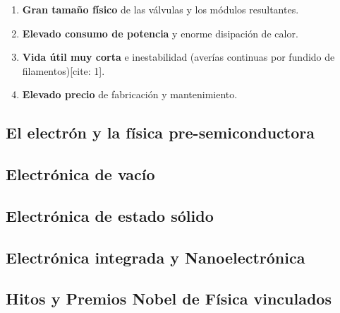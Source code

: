 \begin{enumerate}
    \item \textbf{Gran tamaño físico} de las válvulas y los módulos resultantes.
    \item \textbf{Elevado consumo de potencia} y enorme disipación de calor.
    \item \textbf{Vida útil muy corta} e inestabilidad (averías continuas por fundido de filamentos)[cite: 1].
    \item \textbf{Elevado precio} de fabricación y mantenimiento.
\end{enumerate}

\subsection{El electrón y la física pre-semiconductora}

\subsection{Electrónica de vacío}

\subsection{Electrónica de estado sólido}

\subsection{Electrónica integrada y Nanoelectrónica}

\subsection{Hitos y Premios Nobel de Física vinculados}

